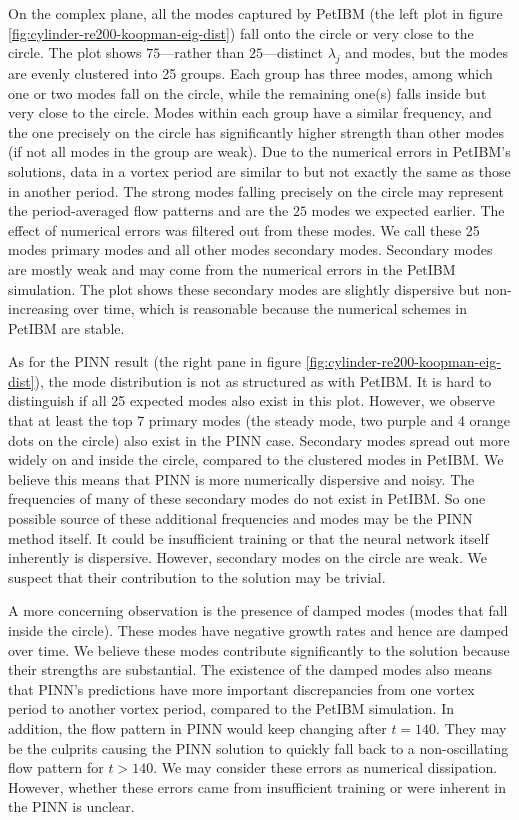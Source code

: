 On the complex plane, all the modes captured by PetIBM (the left plot in figure \ref{fig:cylinder-re200-koopman-eig-dist}) fall onto the circle or very close to the circle.
The plot shows $75$---rather than $25$---distinct $\lambda_j$ and modes, but the modes are evenly clustered into 25 groups.
Each group has three modes, among which one or two modes fall on the circle, while the remaining one(s) falls inside but very close to the circle.
Modes within each group have a similar frequency, and the one precisely on the circle has significantly higher strength than other modes (if not all modes in the group are weak).
Due to the numerical errors in PetIBM's solutions, data in a vortex period are similar to but not exactly the same as those in another period.
The strong modes falling precisely on the circle may represent the period-averaged flow patterns and are the $25$ modes we expected earlier. 
The effect of numerical errors was filtered out from these modes.
We call these 25 modes primary modes and all other modes secondary modes.
Secondary modes are mostly weak and may come from the numerical errors in the PetIBM simulation.
The plot shows these secondary modes are slightly dispersive but non-increasing over time, which is reasonable because the numerical schemes in PetIBM are stable.

As for the PINN result (the right pane in figure \ref{fig:cylinder-re200-koopman-eig-dist}), the mode distribution is not as structured as with PetIBM.
It is hard to distinguish if all 25 expected modes also exist in this plot.
However, we observe that at least the top 7 primary modes (the steady mode, two purple and 4 orange dots on the circle) also exist in the PINN case.
Secondary modes spread out more widely on and inside the circle, compared to the clustered modes in PetIBM.
We believe this means that PINN is more numerically dispersive and noisy.
The frequencies of many of these secondary modes do not exist in PetIBM.
So one possible source of these additional frequencies and modes may be the PINN method itself.
It could be insufficient training or that the neural network itself inherently is dispersive. 
However, secondary modes on the circle are weak.
We suspect that their contribution to the solution may be trivial.

A more concerning observation is the presence of damped modes (modes that fall inside the circle). 
These modes have negative growth rates and hence are damped over time.
We believe these modes contribute significantly to the solution because their strengths are substantial.
The existence of the damped modes also means that PINN's predictions have more important discrepancies from one vortex period to another vortex period, compared to the PetIBM simulation.
In addition, the flow pattern in PINN would keep changing after $t=140$.
They may be the culprits causing the PINN solution to quickly fall back to a non-oscillating flow pattern for $t>140$.
We may consider these errors as numerical dissipation.
However, whether these errors came from insufficient training or were inherent in the PINN is unclear.

